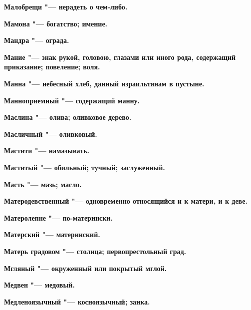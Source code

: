 \begin{mymulticols}{2}
\bfseries Малобрещи\normalfont{} "--- нерадеть о чем-либо. 




\bfseries Мамона\normalfont{} "--- богатство; имение. 




\bfseries Мандра\normalfont{} "--- ограда. 




\bfseries Мание\normalfont{} "--- знак рукой, головою, глазами или иного рода, содержащий приказание; повеление; воля. 




\bfseries Манна\normalfont{} "--- небесный хлеб, данный израильтянам в пустыне. 




\bfseries Манноприемный\normalfont{} "--- содержащий манну. 




\bfseries Маслина\normalfont{} "--- олива; оливковое дерево. 




\bfseries Масличный\normalfont{} "--- оливковый. 




\bfseries Мастити\normalfont{} "--- намазывать. 




\bfseries Маститый\normalfont{} "--- обильный; тучный; заслуженный. 




\bfseries Масть\normalfont{} "--- мазь; масло. 




\bfseries Матеродевственный\normalfont{} "--- одновременно относящийся и к матери, и к деве. 




\bfseries Матеролепне\normalfont{} "--- по-матерински. 




\bfseries Матерский\normalfont{} "--- материнский. 




\bfseries Матерь градовом\normalfont{} "--- столица; первопрестольный град. 




\bfseries Мгляный\normalfont{} "--- окруженный или покрытый мглой. 




\bfseries Медвен\normalfont{} "--- медовый. 




\bfseries Медленоязычный\normalfont{} "--- косноязычный; заика. 





\end{mymulticols}
